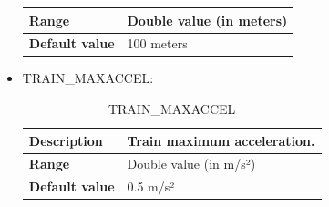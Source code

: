 \begin{itemize}
\begin{longtable}{|l|l|}
				\hline

					\begin{minipage}[t]{0.22\linewidth} \textbf{Range}	\end{minipage}
				&	\begin{minipage}[t]{0.78\linewidth} Double value (in meters) \end{minipage} \\

				\hline

					\begin{minipage}[t]{0.22\linewidth} \textbf{Default value}	\end{minipage}
				&	\begin{minipage}[t]{0.78\linewidth} 100 meters \end{minipage} \\

				\hline

			\end{longtable}

		\item TRAIN\_MAXACCEL:

			\begin{longtable}{|l|l|}
				\caption{TRAIN\_MAXACCEL}\\
				\hline

					\begin{minipage}[t]{0.22\linewidth} \textbf{Description}	\end{minipage}
				&	\begin{minipage}[t]{0.78\linewidth} Train maximum acceleration. \end{minipage} \\

				\hline

					\begin{minipage}[t]{0.22\linewidth} \textbf{Range}	\end{minipage}
				&	\begin{minipage}[t]{0.78\linewidth} Double value (in m/s²) \end{minipage} \\

				\hline

					\begin{minipage}[t]{0.22\linewidth} \textbf{Default value}	\end{minipage}
				&	\begin{minipage}[t]{0.78\linewidth} 0.5 m/s² \end{minipage} \\


\end{longtable}
\end{itemize}
